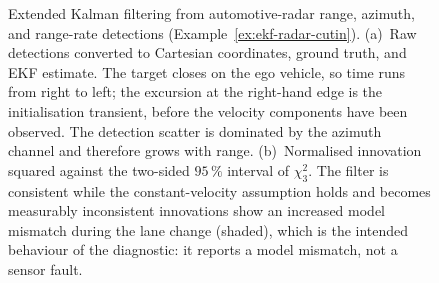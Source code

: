\documentclass[graybox,envcountchap]{style/SNmono}
\providecommand{\DIFadd}[1]{{\protect\color{blue} #1}} %
\providecommand{\DIFdel}[1]{{\protect\color{red} #1}} %
\providecommand{\DIFaddFL}[1]{\DIFadd{#1}} %
\providecommand{\DIFdelFL}[1]{\DIFdel{#1}} %
\providecommand{\DIFaddbeginFL}{} %
\providecommand{\DIFaddendFL}{} %
\providecommand{\DIFdelbeginFL}{} %
\providecommand{\DIFdelendFL}{} %
\begin{document}
\begin{figure}[!t]
{
}
\caption{Extended Kalman filtering from automotive-radar
range, azimuth, and range-rate detections (Example~\ref{ex:ekf-radar-cutin}).
(a)~Raw detections converted to Cartesian coordinates, ground truth, and EKF
estimate. The target closes on the ego vehicle, so time runs from right to left;
the excursion at the right-hand edge is the initialisation transient, before the
velocity components have been observed. The detection scatter is dominated by
the azimuth channel and therefore grows with range. (b)~Normalised innovation
squared against the two-sided $95\,\%$ interval of $\chi^{2}_{3}$. The \DIFdelbeginFL \DIFdelFL{filter is
consistent while the constant-velocity assumption holds and becomes measurably
inconsistent }\DIFdelendFL \DIFaddbeginFL \DIFaddFL{innovations show an increased model mismatch }\DIFaddendFL during the lane change (shaded), which is the intended behaviour of
the diagnostic: it reports a model mismatch, not a sensor fault.}
\label{fig:ekf-radar-cutin}
\end{figure}
\end{document}
